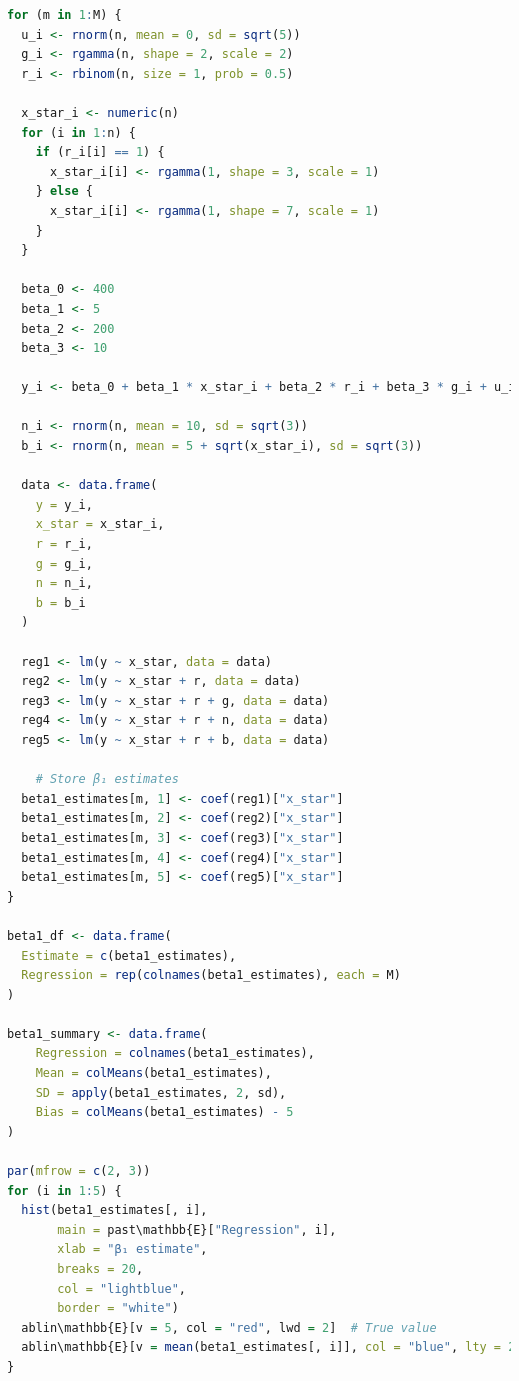 \documentclass[a4paper,12pt]{article} %
\theoremstyle{nonitalic}
\newenvironment{solution}[1]
  {\renewcommand\theinnercustomsol{#1}\innercustomsol}
  {\endinnercustomsol}
\newcounter{solutionctr}
\renewcommand{\thesolutionctr}{(\alph{solutionctr})}
\newenvironment{autosolution}
  {\stepcounter{solutionctr}\begin{solution}{\thesolutionctr}}
  {\end{solution}}
\begin{document}
\begin{autosolution}
\begin{lstlisting}[language=R]
for (m in 1:M) {
  u_i <- rnorm(n, mean = 0, sd = sqrt(5))
  g_i <- rgamma(n, shape = 2, scale = 2)
  r_i <- rbinom(n, size = 1, prob = 0.5)
    
  x_star_i <- numeric(n)
  for (i in 1:n) {
    if (r_i[i] == 1) {
      x_star_i[i] <- rgamma(1, shape = 3, scale = 1)
    } else {
      x_star_i[i] <- rgamma(1, shape = 7, scale = 1)
    }
  }
    
  beta_0 <- 400
  beta_1 <- 5
  beta_2 <- 200
  beta_3 <- 10
    
  y_i <- beta_0 + beta_1 * x_star_i + beta_2 * r_i + beta_3 * g_i + u_i
    
  n_i <- rnorm(n, mean = 10, sd = sqrt(3))
  b_i <- rnorm(n, mean = 5 + sqrt(x_star_i), sd = sqrt(3))
    
  data <- data.frame(
    y = y_i,
    x_star = x_star_i,
    r = r_i,
    g = g_i,
    n = n_i,
    b = b_i
  )
  
  reg1 <- lm(y ~ x_star, data = data)
  reg2 <- lm(y ~ x_star + r, data = data)
  reg3 <- lm(y ~ x_star + r + g, data = data)
  reg4 <- lm(y ~ x_star + r + n, data = data)
  reg5 <- lm(y ~ x_star + r + b, data = data)
    
    # Store β₁ estimates
  beta1_estimates[m, 1] <- coef(reg1)["x_star"]
  beta1_estimates[m, 2] <- coef(reg2)["x_star"]
  beta1_estimates[m, 3] <- coef(reg3)["x_star"]
  beta1_estimates[m, 4] <- coef(reg4)["x_star"]
  beta1_estimates[m, 5] <- coef(reg5)["x_star"]
}

beta1_df <- data.frame(
  Estimate = c(beta1_estimates),
  Regression = rep(colnames(beta1_estimates), each = M)
)

beta1_summary <- data.frame(
    Regression = colnames(beta1_estimates),
    Mean = colMeans(beta1_estimates),
    SD = apply(beta1_estimates, 2, sd),
    Bias = colMeans(beta1_estimates) - 5
)

par(mfrow = c(2, 3))
for (i in 1:5) {
  hist(beta1_estimates[, i], 
       main = past\mathbb{E}["Regression", i], 
       xlab = "β₁ estimate",
       breaks = 20,
       col = "lightblue",
       border = "white")
  ablin\mathbb{E}[v = 5, col = "red", lwd = 2]  # True value
  ablin\mathbb{E}[v = mean(beta1_estimates[, i]], col = "blue", lty = 2, lwd = 2)  # Mean estimate
}
\end{lstlisting}

\end{autosolution}
\end{document}
